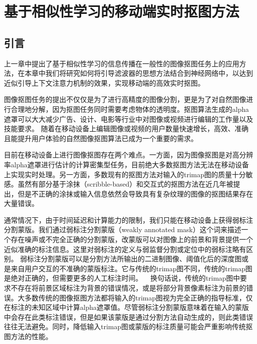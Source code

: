 \chapter{基于相似性学习的移动端实时抠图方法}
\section{引言}
上一章中提出了基于相似性学习的信息传播在一般性的图像抠图任务上的应用方法，在本章中我们将研究如何将引导滤波器的思想方法结合到神经网络中，以达到近似引导上下文注意力机制的效果，实现移动端的高效实时抠图。

图像抠图任务的提出不仅仅是为了进行高精度的图像分割，更是为了对自然图像进行合理地分解，因为抠图任务同时需要考虑物体的透明度。抠图算法生成的alpha遮罩可以大大减少广告、设计、电影等行业中对图像或视频进行编辑的工作量以及技能要求。
随着在移动设备上编辑图像或视频的用户数量快速增长，高效、准确且能提升用户体验的自然图像抠图算法已成为一个重要的需求。

目前在移动设备上进行图像抠图存在两个难点。一方面，因为图像抠图是对高分辨率alpha遮罩进行估计的计算密集型任务，目前绝大多数抠图方法\cite{levin2008closed,chen2013knn,cho2016natural,xu2017deep}无法在移动设备上实现实时处理。另一方面，多数现有的抠图方法对输入的trimap图的质量十分敏感。虽然有部分基于涂抹（scribble-based）\cite{lee2011nonlocal}和交互式\cite{yang2018active}的抠图方法在近几年被提出，但是不正确的涂抹或输入信息依然会导致具有复杂纹理的图像的抠图结果存在大量错误。

通常情况下，由于时间延迟和计算能力的限制，我们只能在移动设备上获得弱标注分割蒙版。我们通过弱标注分割蒙版（weakly annotated mask）这个词来描述一个存在噪声或不完全正确的分割蒙版，改蒙版可以对图像上的前景和背景提供一个近似准确的标注信息。这里对弱标注的定义与弱监督分割\cite{papandreou2015weakly}或定位\cite{oquab2015object}中的弱标注略有区别。
弱标注分割蒙版可以是分割方法所输出的二进制图像、阈值化后的深度图或是来自用户交互的不准确的蒙版标注。它与传统的trimap图不同，传统的trimap图是绝对正确的，但需要更多的人工标注时间。
  换句话说，传统的trimap图中要求不存在将前景区域标注为背景的错误情况，或是将部分背景像素标注为前景的错误。大多数传统的图像抠图方法都将输入的trimap图视为完全正确的指导标准，仅在标注的未知区域中计算alpha遮罩值。尽管弱标注分割蒙版意味着在输入的蒙版中会存在此类标注错误，但是如果该蒙版是通过分割方法自动生成的，则此类错误往往无法避免。同时，降低输入trimap图或蒙版的标注质量可能会严重影响传统抠图方法的性能。

